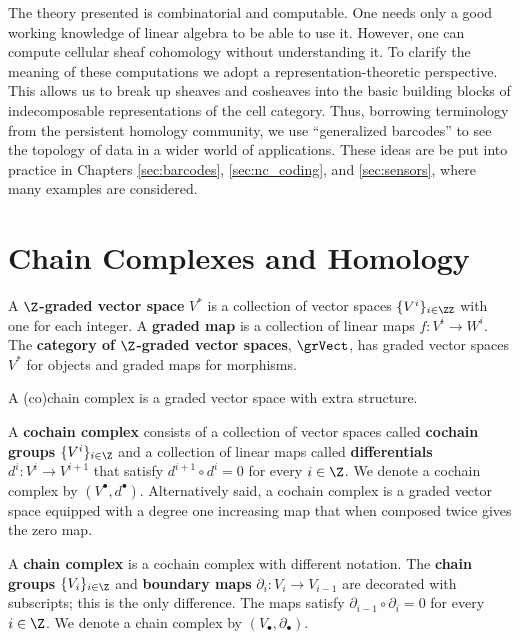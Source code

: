 The theory presented is combinatorial and computable. One needs only a good working knowledge of linear algebra to be able to use it. However, one can compute cellular sheaf cohomology without understanding it. To clarify the meaning of these computations we adopt a representation-theoretic perspective. This allows us to break up sheaves and cosheaves into the basic building blocks of indecomposable representations of the cell category. Thus, borrowing terminology from the persistent homology community, we use ``generalized barcodes'' to see the topology of data in a wider world of applications. These ideas are be put into practice in Chapters \ref{sec:barcodes}, \ref{sec:nc_coding}, and \ref{sec:sensors}, where many examples are considered.

\section{Chain Complexes and Homology}

\begin{defn}
A \textbf{$\Z$-graded vector space} $V^{\ast}$ is a collection of vector spaces $\{V^i\}_{i\in\ZZ}$ with one for each integer. A \textbf{graded map} is a collection of linear maps $f:V^i\to W^i$. The \textbf{category of $\Z$-graded vector spaces}, $\grVect$, has graded vector spaces $V^{\ast}$ for objects and graded maps for morphisms.
\end{defn}

A (co)chain complex is a graded vector space with extra structure.

\begin{defn}
A \textbf{cochain complex} consists of a collection of vector spaces called \textbf{cochain groups} $\{V^i\}_{i\in\Z}$ and a collection of linear maps called \textbf{differentials} $d^i:V^i\to V^{i+1}$ that satisfy $d^{i+1}\circ d^i=0$ for every $i\in\Z$. We denote a cochain complex by $(V^{\bullet},d^{\bullet})$. Alternatively said, a cochain complex is a graded vector space equipped with a degree one increasing map that when composed twice gives the zero map.


A \textbf{chain complex} is a cochain complex with different notation. The \textbf{chain groups} $\{V_i\}_{i\in\Z}$ and \textbf{boundary maps} $\partial_i:V_i\to V_{i-1}$ are decorated with subscripts; this is the only difference. The maps satisfy $\partial_{i-1}\circ\partial_i=0$ for every $i\in\Z$. We denote a chain complex by $(V_{\bullet},\partial_{\bullet})$.
\end{defn}


